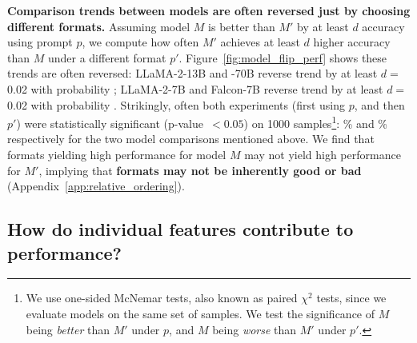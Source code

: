 \documentclass{article} %
\newcommand{\tbdone}[1]{}
\renewcommand{\tbdone}[1]{{\color{black}{#1}}}  %
\renewcommand{\paragraph}[1]{\textbf{#1}}
\begin{document}
\paragraph{Comparison trends between models are often reversed just by choosing different formats.} 
Assuming model $M$ is better than $M'$ by at least $d$ accuracy using prompt $p$, we compute how often $M'$ achieves at least $d$ higher accuracy than $M$ under a different format $p'$.
Figure~\ref{fig:model_flip_perf} shows these trends are often reversed: LLaMA-2-13B and -70B reverse trend by at least $d=$ 0.02 with probability \tbdone{0.141}; LLaMA-2-7B and Falcon-7B reverse trend by at least $d=$ 0.02 with probability \tbdone{0.140}. 
Strikingly, often both experiments (first using $p$, and then $p'$) were statistically significant (p-value~$<0.05$) on 1000 samples\footnote{We use one-sided McNemar tests, also known as paired $\chi^2$ tests, since we evaluate models on the same set of samples. We test the significance of $M$ being \textit{better} than $M'$ under $p$, and $M$ being \textit{worse} than $M'$ under $p'$.}: \tbdone{76}\% and \tbdone{47}\% respectively for the two model comparisons mentioned above.
We find that formats yielding high performance for model $M$ may not yield high performance for $M'$, implying that \textbf{formats may not be inherently good or bad} (Appendix~\ref{app:relative_ordering}).

\vspace{-1mm}
\subsection{How do individual features contribute to performance?}\label{sec:individual_features}
\vspace{-1mm}

\end{document}
